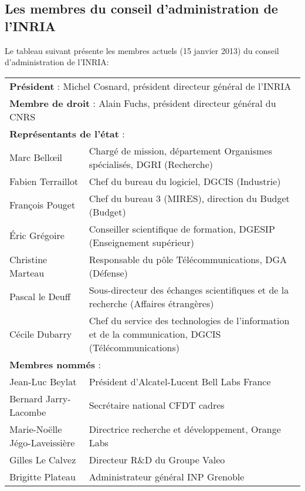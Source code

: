 \documentclass[a4paper, 11pt]{report}
\begin{document}
  \subsection{Les membres du conseil d'administration de l'INRIA}
  Le tableau suivant présente les membres actuels (15 janvier 2013) du conseil
  d'administration de l'INRIA: \par
      \begin{tabular}{|l|p{8cm}|}
    \multicolumn{2}{l}{\textbf{Président} : Michel Cosnard, président directeur général de
    l'INRIA} \\
    \multicolumn{2}{l}{\textbf{Membre de droit} : Alain Fuchs, président directeur général
    du CNRS} \\
        \multicolumn{2}{l}{\textbf{Représentants de l'état} :} \\
        \hline
        Marc Bellœil &
        Chargé de mission, département Organismes spécialisés, DGRI (Recherche) \\
        \hline
        Fabien Terraillot & Chef du bureau du logiciel, DGCIS (Industrie) \\
        François Pouget & Chef du bureau 3 (MIRES), direction du Budget (Budget) \\
        \hline
        Éric Grégoire &
        Conseiller scientifique de formation, DGESIP (Enseignement supérieur) \\
        \hline
        Christine Marteau & Responsable du pôle Télécommunications, DGA (Défense) \\
        \hline
        Pascal le Deuff &
        Sous-directeur des échanges scientifiques et de la recherche (Affaires étrangères) \\
        \hline
        Cécile Dubarry &
        Chef du service des technologies de l’information et de la communication, DGCIS (Télécommunications) \\
        \hline
        \multicolumn{2}{l}{\textbf{Membres nommés} :}\\
        \hline
        Jean-Luc Beylat & Président d’Alcatel-Lucent Bell Labs France \\
        \hline
        Bernard Jarry-Lacombe & Secrétaire national CFDT cadres \\
        \hline
        Marie-Noëlle Jégo-Laveissière & Directrice recherche et développement,
        Orange Labs \\
        \hline
        Gilles Le Calvez & Directeur R\&D du Groupe Valeo \\
        \hline
        Brigitte Plateau & Administrateur général INP Grenoble \\

\end{tabular}
\end{document}
